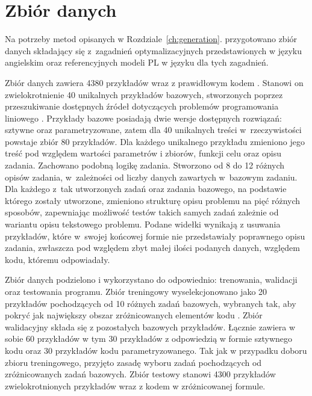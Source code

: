 \chapter{Zbiór danych}\label{ch:dataset}

Na potrzeby metod opisanych w Rozdziale~\ref{ch:generation}. przygotowano zbiór danych składający się z~zagadnień optymalizacyjnych przedstawionych w języku angielskim oraz referencyjnych modeli PL w języku  dla tych zagadnień.

Zbiór danych zawiera 4380 przykładów wraz z prawidłowym kodem . Stanowi on zwielokrotnienie 40 unikalnych przykładów bazowych, stworzonych poprzez przeszukiwanie dostępnych źródeł dotyczących problemów programowania liniowego \cite{brilliant_linear,byjus_linear,cimt,arsdcollege2020,libretexts_linear,superprof_linear,toppr_graphical}. Przykłady bazowe posiadają dwie wersje dostępnych rozwiązań: sztywne oraz parametryzowane, zatem dla 40 unikalnych treści w~rzeczywistości powstaje zbiór 80 przykładów. Dla każdego unikalnego przykładu zmieniono jego treść pod względem wartości parametrów i zbiorów, funkcji celu oraz opisu zadania. Zachowano podobną logikę zadania. Stworzono od 8 do 12 różnych opisów zadania, w~zależności od liczby danych zawartych w~bazowym zadaniu. Dla każdego z~tak utworzonych zadań oraz zadania bazowego, na podstawie którego zostały utworzone, zmieniono strukturę opisu problemu na pięć różnych sposobów, zapewniając możliwość testów takich samych zadań zależnie od wariantu opisu tekstowego problemu. Podane widełki wynikają z usuwania przykładów, które w~swojej końcowej formie nie przedstawiały poprawnego opisu zadania, zwłaszcza pod względem zbyt małej ilości podanych danych, względem kodu, któremu odpowiadały.

Zbiór danych podzielono i wykorzystano do odpowiednio: trenowania, walidacji oraz testowania programu. Zbiór treningowy wyselekcjonowano jako 20 przykładów pochodzących od 10 różnych zadań bazowych, wybranych tak, aby pokryć jak największy obszar zróżnicowanych elementów kodu . Zbiór walidacyjny składa się z pozostałych bazowych przykładów. Łącznie zawiera w sobie 60 przykładów w tym 30 przykładów z odpowiedzią w formie sztywnego kodu oraz 30 przykładów kodu parametryzowanego. Tak jak w przypadku doboru zbioru treningowego, przyjęto zasadę wyboru zadań pochodzących od zróżnicowanych zadań bazowych. Zbiór testowy stanowi 4300 przykładów zwielokrotnionych przykładów wraz z kodem  w zróżnicowanej formule.

